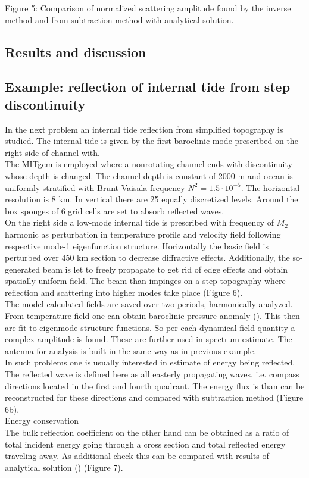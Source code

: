 Figure 5: Comparison of normalized scattering amplitude found by the inverse method and from 
subtraction method with analytical solution.

\subsection{Results and discussion}

\subsection{Example: reflection of internal tide from step discontinuity}
In the next problem an internal tide reflection from simplified topography is studied. The internal 
tide is given by the first baroclinic mode prescribed on the right side of channel with.\\
The MITgcm is employed where a nonrotating channel ends with discontinuity whose depth is changed. 
The channel 
depth is constant of 2000 m and ocean is uniformly stratified with Brunt-Vaisala frequency $ N^2 = 
1.5 \cdot 10^{-5} $. The horizontal resolution is 8 km. In vertical there are 25 equally 
discretized levels. Around the box sponges of 6 grid cells are set to absorb reflected waves.\\
On the right side a low-mode internal tide is prescribed with frequency of $ M_2 $ harmonic as 
perturbation in temperature profile and velocity field following respective mode-1 eigenfunction 
structure. Horizontally the basic field is perturbed over 450 km section to decrease diffractive 
effects. Additionally, the so-generated beam is let to freely propagate to get rid of edge effects 
and obtain spatially uniform field. The beam than impinges on a step topography where reflection  
and scattering into higher modes take place (Figure 6).\\
The model calculated fields are saved over two periods, harmonically analyzed. From temperature 
field one can obtain baroclinic pressure anomaly (\cite{Kelly2010}). This then are fit to eigenmode 
structure functions. So per each dynamical field quantity a complex amplitude is found. These are 
further used in spectrum estimate. The antenna for analysis is built in the same way as in previous 
example.\\
In such problems one is usually interested in estimate of energy being reflected. The reflected 
wave is defined here as all easterly propagating waves, i.e. compass directions located in the 
first and fourth quadrant. The energy flux is than can be reconstructed for these directions and 
compared with subtraction method (Figure 6b).\\
Energy conservation\\
The bulk reflection coefficient on the other hand can be obtained as a ratio of total incident 
energy going through a cross section and total reflected energy traveling away. As additional check 
this can be compared with results of analytical solution (\cite{chapman1981scattering}) (Figure 
7).\\

